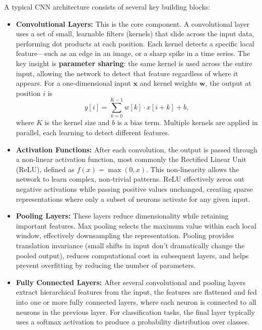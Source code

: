 A typical CNN architecture consists of several key building blocks:

\begin{itemize}
  \item \textbf{Convolutional Layers:} This is the core component. A convolutional layer uses a set of small, learnable filters (kernels) that slide across the input data, performing dot products at each position. Each kernel detects a specific local feature—such as an edge in an image, or a sharp spike in a time series. The key insight is \textbf{parameter sharing}: the same kernel is used across the entire input, allowing the network to detect that feature regardless of where it appears. For a one-dimensional input $\mathbf{x}$ and kernel weights $\mathbf{w}$, the output at position $i$ is
  \begin{equation}
    y[i] = \sum_{k=0}^{K-1} w[k] \cdot x[i+k] + b,
    \label{eq:1d_convolution}
  \end{equation}
  where $K$ is the kernel size and $b$ is a bias term. Multiple kernels are applied in parallel, each learning to detect different features.
  
  \item \textbf{Activation Functions:} After each convolution, the output is passed through a non-linear activation function, most commonly the Rectified Linear Unit (ReLU), defined as $f(x) = \max(0, x)$. This non-linearity allows the network to learn complex, non-trivial patterns. ReLU effectively zeros out negative activations while passing positive values unchanged, creating sparse representations where only a subset of neurons activate for any given input.
  
  \item \textbf{Pooling Layers:} These layers reduce dimensionality while retaining important features. Max pooling selects the maximum value within each local window, effectively downsampling the representation. Pooling provides translation invariance (small shifts in input don't dramatically change the pooled output), reduces computational cost in subsequent layers, and helps prevent overfitting by reducing the number of parameters.
  
  \item \textbf{Fully Connected Layers:} After several convolutional and pooling layers extract hierarchical features from the input, the features are flattened and fed into one or more fully connected layers, where each neuron is connected to all neurons in the previous layer. For classification tasks, the final layer typically uses a softmax activation to produce a probability distribution over classes.
\end{itemize}

